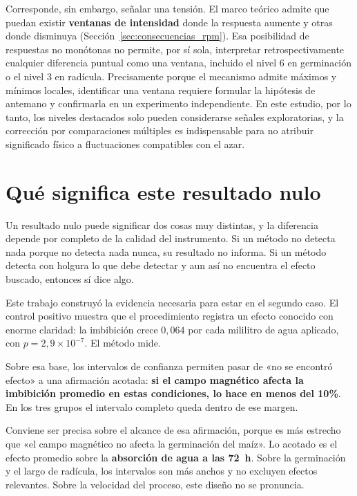 Corresponde, sin embargo, señalar una tensión. El marco teórico admite que puedan existir \textbf{ventanas de intensidad} donde la respuesta aumente y otras donde disminuya (Sección~\ref{sec:consecuencias_rpm}). Esa posibilidad de respuestas no monótonas no permite, por sí sola, interpretar retrospectivamente cualquier diferencia puntual como una ventana, incluido el nivel 6 en germinación o el nivel 3 en radícula. Precisamente porque el mecanismo admite máximos y mínimos locales, identificar una ventana requiere formular la hipótesis de antemano y confirmarla en un experimento independiente. En este estudio, por lo tanto, los niveles destacados solo pueden considerarse señales exploratorias, y la corrección por comparaciones múltiples es indispensable para no atribuir significado físico a fluctuaciones compatibles con el azar.

\section{Qué significa este resultado nulo}
\label{sec:disc_nulo}

Un resultado nulo puede significar dos cosas muy distintas, y la diferencia depende por completo de la calidad del instrumento. Si un método no detecta nada porque no detecta nada nunca, su resultado no informa. Si un método detecta con holgura lo que debe detectar y aun así no encuentra el efecto buscado, entonces sí dice algo.

Este trabajo construyó la evidencia necesaria para estar en el segundo caso. El control positivo muestra que el procedimiento registra un efecto conocido con enorme claridad: la imbibición crece \(0{,}064\) por cada mililitro de agua aplicado, con \(p = 2{,}9\times10^{-7}\). El método mide.

Sobre esa base, los intervalos de confianza permiten pasar de «no se encontró efecto» a una afirmación acotada: \textbf{si el campo magnético afecta la imbibición promedio en estas condiciones, lo hace en menos del 10\%}. En los tres grupos el intervalo completo queda dentro de ese margen.

Conviene ser precisa sobre el alcance de esa afirmación, porque es más estrecho que «el campo magnético no afecta la germinación del maíz». Lo acotado es el efecto promedio sobre la \textbf{absorción de agua a las 72~h}. Sobre la germinación y el largo de radícula, los intervalos son más anchos y no excluyen efectos relevantes. Sobre la velocidad del proceso, este diseño no se pronuncia.

